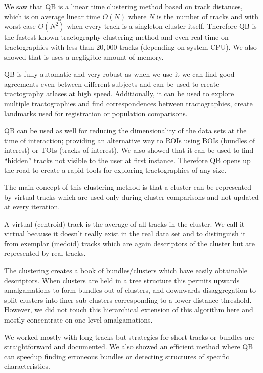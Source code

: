 \documentclass[preprint,authoryear,a4paper,10pt,onecolumn]{elsarticle}
\begin{document}
We saw that QB is a linear time clustering method based on track
distances, which is on average linear time $O(N)$ where $N$ is the
number of tracks and with worst case $O(N^{2})$ when every track is a
singleton cluster itself. Therefore QB is the fastest known tractography
clustering method and even real-time on tractographies with less than
$20,000$ tracks (depending on system CPU). We also showed that is uses a
negligible amount of memory.

QB is fully automatic and very robust as when we use it we can find good
agreements even between different subjects and can be used to create
tractography atlases at high speed. Additionally, it can be used to
explore multiple tractographies and find correspondences between
tractographies, create landmarks used for registration or population
comparisons.

QB can be used as well for reducing the dimensionality of the data sets
at the time of interaction; providing an alternative way to ROIs using
BOIs (bundles of interest) or TOIs (tracks of interest). We also showed
that it can be used to find {}``hidden'' tracks not visible to the user
at first instance. Therefore QB opens up the road to create a rapid
tools for exploring tractographies of any size.

The main concept of this clustering method is that a cluster can be
represented by virtual tracks which are used only during cluster
comparisons and not updated at every iteration.

A virtual (centroid) track is the average of all tracks in the cluster.
We call it virtual because it doesn't really exist in the real data set
and to distinguish it from exemplar (medoid) tracks which are again
descriptors of the cluster but are represented by real tracks.

The clustering creates a book of bundles/clusters which have easily
obtainable descriptors. When clusters are held in a tree structure this
permits upwards amalgamations to form bundles out of clusters, and
downwards disaggregation to split clusters into finer sub-clusters
corresponding to a lower distance threshold. However, we did not touch
this hierarchical extension of this algorithm here and mostly
concentrate on one level amalgamations.

We worked mostly with long tracks but strategies for short tracks
or bundles are straightforward and documented. We also showed an efficient
method where QB can speedup finding erroneous bundles or detecting
structures of specific characteristics.
\end{document}
